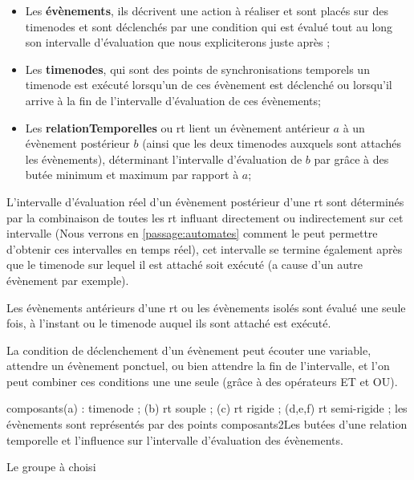 \begin{itemize}

    \item Les \textbf{évènements}, ils décrivent une action à réaliser et sont placés sur des \glspl{timenode} et sont déclenchés par une condition qui est évalué tout au long son intervalle d'évaluation que nous expliciterons juste après ;
    
    \item Les \textbf{\glspl{timenode}}, qui sont des points de synchronisations temporels un \gls{timenode} est exécuté lorsqu'un de ces évènement est déclenché ou lorsqu'il arrive à la fin de l'intervalle d'évaluation de ces évènements;

    \item Les \textbf{\glspl{relationTemporelle}} ou \acrshort{rt} lient un évènement antérieur $a$ à un évènement postérieur $b$ (ainsi que les deux timenodes auxquels sont attachés les évènements), déterminant l'intervalle d'évaluation de $b$ par grâce à des butée minimum et maximum par rapport à $a$;

\end{itemize}

L'intervalle d'évaluation réel d'un évènement postérieur d'une \acrshort{rt} sont déterminés par la combinaison de toutes les \acrshort{rt} influant directement ou indirectement sur cet intervalle (Nous verrons en \autoref{passage:automates} comment le \csp{} peut permettre d'obtenir ces intervalles en temps réel), cet intervalle se termine également après que le \gls{timenode} sur lequel il est attaché soit exécuté (a cause d'un autre évènement par exemple).

Les évènements antérieurs d'une \acrshort{rt} ou les évènements isolés sont évalué une seule fois, à l'instant ou le \gls{timenode} auquel ils sont attaché est exécuté.

\begin{apparte}
La condition de déclenchement d'un évènement peut écouter une variable, attendre un évènement ponctuel, ou bien attendre la fin de l'intervalle, et l'on peut combiner ces conditions une une seule (grâce à des opérateurs ET et OU).
\end{apparte}

%
{composants}{\textcolor{colorPri}{(a)} : \gls{timenode} ; %
                    \textcolor{colorPri}{(b)} \acrshort{rt} souple ; %
                    \textcolor{colorPri}{(c)} \acrshort{rt} rigide ; %
                    \textcolor{colorPri}{(d,e,f)} \acrshort{rt} semi-rigide ; %
                    les évènements sont représentés par des points%
                    }%
{composants2}{Les butées d'une relation temporelle et l'influence sur l'intervalle d'évaluation des évènements.}

Le groupe \ossia{} à choisi 